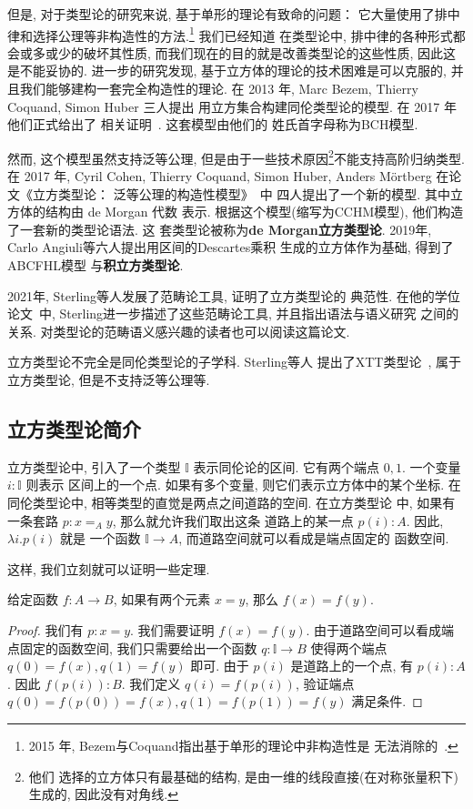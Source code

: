 但是, 对于类型论的研究来说, 基于单形的理论有致命的问题：
它大量使用了排中律和选择公理等非构造性的方法.\footnote{2015
年, Bezem与Coquand指出基于单形的理论中非构造性是
无法消除的~\cite{bezem:2015:simplicial}.} 我们已经知道
在类型论中, 排中律的各种形式都会或多或少的破坏其性质,
而我们现在的目的就是改善类型论的这些性质, 因此这是不能妥协的.
进一步的研究发现, 基于立方体的理论的技术困难是可以克服的,
并且我们能够建构一套完全构造性的理论. 在 2013 年,
Marc Bezem, Thierry Coquand, Simon Huber 三人提出
用立方集合构建同伦类型论的模型. 在 2017 年他们正式给出了
相关证明~\cite{bch:2017:cubical}. 这套模型由他们的
姓氏首字母称为BCH模型.

然而, 这个模型虽然支持泛等公理, 但是由于一些技术原因\footnote{他们
选择的立方体只有最基础的结构, 是由一维的线段直接(在对称张量积下)生成的,
因此没有对角线.}不能支持高阶归纳类型. 在 2017 年,
Cyril Cohen, Thierry Coquand, Simon Huber, Anders M\"ortberg
在论文《立方类型论： 泛等公理的构造性模型》~\cite{abcfhl:2021:cubical}中
四人提出了一个新的模型. 其中立方体的结构由 de Morgan 代数
表示. 根据这个模型(缩写为CCHM模型), 他们构造了一套新的类型论语法. 这
套类型论被称为\textbf{de Morgan立方类型论}.
2019年, Carlo Angiuli等六人提出用区间的Descartes乘积
生成的立方体作为基础, 得到了ABCFHL模型
与\textbf{积立方类型论}.

2021年, Sterling等人发展了范畴论工具, 证明了立方类型论的
典范性. 在他的学位论文~\cite{sterling:2021:thesis}中,
Sterling进一步描述了这些范畴论工具, 并且指出语法与语义研究
之间的关系. 对类型论的范畴语义感兴趣的读者也可以阅读这篇论文.

立方类型论不完全是同伦类型论的子学科. Sterling等人
提出了XTT类型论~\cite{sterling:2019:xtt}, 属于立方类型论,
但是不支持泛等公理等.

\subsection{立方类型论简介}

立方类型论中, 引入了一个类型 \(\mathbb I\) 表示同伦论的区间.
它有两个端点 \(0,1\). 一个变量 \(i : \mathbb I\) 则表示
区间上的一个点. 如果有多个变量, 则它们表示立方体中的某个坐标.
在同伦类型论中, 相等类型的直觉是两点之间道路的空间. 在立方类型论
中, 如果有一条套路 \(p : x =_A y\), 那么就允许我们取出这条
道路上的某一点 \(p(i) : A\). 因此, \(\lambda i. p(i)\) 就是
一个函数 \(\mathbb I \to A\), 而道路空间就可以看成是端点固定的
函数空间.

这样, 我们立刻就可以证明一些定理.

\begin{theorem}
给定函数 \(f : A \to B\), 如果有两个元素 \(x = y\), 那么
\(f(x) = f(y)\).
\end{theorem}
\begin{proof}
我们有 \(p : x = y\). 我们需要证明 \(f(x) = f(y)\).
由于道路空间可以看成端点固定的函数空间, 我们只需要给出一个函数
\(q : \mathbb I \to B\) 使得两个端点 \(q(0) = f(x),
q(1) = f(y)\) 即可. 由于 \(p(i)\) 是道路上的一个点, 有
\(p(i) : A\). 因此 \(f(p(i)) : B\). 我们定义 \(q(i) = f(p(i))\),
验证端点 \(q(0) = f(p(0)) = f(x), q(1) = f(p(1)) = f(y)\)
满足条件.
\end{proof}

